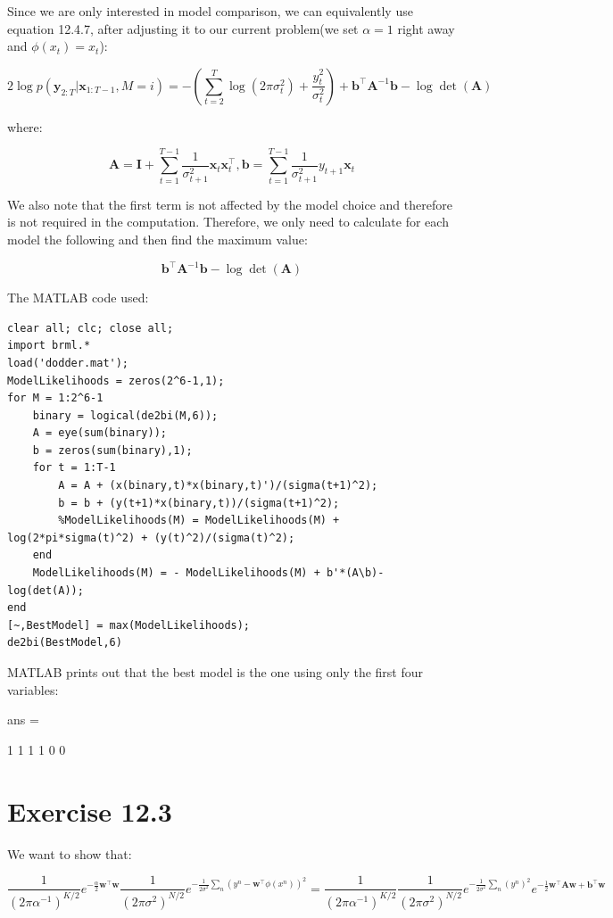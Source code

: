 \documentclass[11pt,a4paper,oneside]{report}
\begin{document}
Since we are only interested in model comparison, we can equivalently use equation 12.4.7, after adjusting it to our current problem(we set $\alpha = 1$ right away and $\phi(x_t)=x_t$):

$$2\log p(\mathbf{y}_{2:T}|\mathbf{x}_{1:T-1},M=i)=-\left(\sum_{t=2}^{T}\log \left(2\pi\sigma_t^2\right)+\frac{y_t^2}{\sigma_t^2}\right)+\mathbf{b}^\top\mathbf{A}^{-1}\mathbf{b}-\log \det (\mathbf{A})$$

where:

$$\mathbf{A}=\mathbf{I}+\sum_{t=1}^{T-1}\frac{1}{\sigma_{t+1}^2}\mathbf{x}_t\mathbf{x}_t^\top, \mathbf{b}=\sum_{t=1}^{T-1}\frac{1}{\sigma_{t+1}^2}y_{t+1}\mathbf{x}_t$$

We also note that the first term is not affected by the model choice and therefore is not required in the computation. Therefore, we only need to calculate for each model the following and then find the maximum value:

$$\mathbf{b}^\top\mathbf{A}^{-1}\mathbf{b}-\log \det (\mathbf{A})$$

The MATLAB code used:

\begin{lstlisting}
clear all; clc; close all;
import brml.*
load('dodder.mat');
ModelLikelihoods = zeros(2^6-1,1);
for M = 1:2^6-1
    binary = logical(de2bi(M,6));
    A = eye(sum(binary));
    b = zeros(sum(binary),1);
    for t = 1:T-1
        A = A + (x(binary,t)*x(binary,t)')/(sigma(t+1)^2);
        b = b + (y(t+1)*x(binary,t))/(sigma(t+1)^2);
        %ModelLikelihoods(M) = ModelLikelihoods(M) + log(2*pi*sigma(t)^2) + (y(t)^2)/(sigma(t)^2);
    end
    ModelLikelihoods(M) = - ModelLikelihoods(M) + b'*(A\b)-log(det(A));
end
[~,BestModel] = max(ModelLikelihoods);
de2bi(BestModel,6)
\end{lstlisting}

MATLAB prints out that the best model is the one using only the first four variables:

ans =

     1     1     1     1     0     0

\section*{Exercise 12.3}

We want to show that:

$$\frac{1}{(2\pi \alpha^{-1})^{K/2}}e^{-\frac{\alpha}{2}\mathbf{w}^\top \mathbf{w}}\frac{1}{(2\pi \sigma^{2})^{N/2}}e^{-\frac{1}{2\sigma^2}\sum_n (y^n-\mathbf{w}^\top \phi(x^n))^2}=\frac{1}{(2\pi \alpha^{-1})^{K/2}}\frac{1}{(2\pi \sigma^{2})^{N/2}}e^{-\frac{1}{2\sigma^2}\sum_n(y^n)^2}e^{-\frac{1}{2}\mathbf{w}^\top\mathbf{A}\mathbf{w}+\mathbf{b}^\top\mathbf{w}}$$
\end{document}
